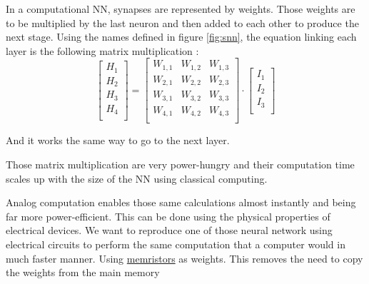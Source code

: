 In a computational \ac{NN}, synapses are represented by weights. Those weights are to be multiplied by the last neuron and then added to each other to produce the next stage. Using the names defined in figure \ref{fig:snn}, the equation linking each layer is the following matrix multiplication :
\begin{equation}
  \begin{bmatrix}
    H_1\\ H_2\\ H_3\\ H_4\\
  \end{bmatrix}
  =
  \begin{bmatrix}
    W_{1,1} & W_{1,2} & W_{1,3}\\
    W_{2,1} & W_{2,2} & W_{2,3}\\
    W_{3,1} & W_{3,2} & W_{3,3}\\
    W_{4,1} & W_{4,2} & W_{4,3}\\
  \end{bmatrix}
  \cdot
  \begin{bmatrix}
    I_1\\ I_2\\ I_3\\
  \end{bmatrix}
\end{equation}

And it works the same way to go to the next layer.


Those matrix multiplication are very power-hungry and their computation time scales up with the size of the \ac{NN} using classical computing.

Analog computation enables those same calculations almost instantly and being far more power-efficient. This can be done using the physical properties of electrical devices.
We want to reproduce one of those neural network using electrical circuits to perform the same computation that a computer would in much faster manner.
Using \hyperref[subsec:memristors]{memristors} as weights. This removes the need to copy the weights from the main memory
